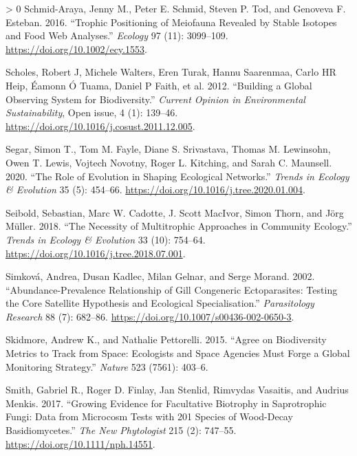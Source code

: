 \documentclass[11pt]{article}
\newlength{\cslhangindent}
\newenvironment{CSLReferences}[3] %
 {%
  \setlength{\parindent}{0pt}
  \ifodd #1 \everypar{\setlength{\hangindent}{\cslhangindent}}\ignorespaces\fi
  \ifnum #2 > 0
  \setlength{\parskip}{#2\baselineskip}
  \fi
 }%
 {}
\begin{document}
\begin{CSLReferences}{1}{0}
\leavevmode\hypertarget{ref-Schmid-Araya2016TroPos}{}%
Schmid-Araya, Jenny M., Peter E. Schmid, Steven P. Tod, and Genoveva F.
Esteban. 2016. {``Trophic Positioning of Meiofauna Revealed by Stable
Isotopes and Food Web Analyses.''} \emph{Ecology} 97 (11): 3099--109.
\url{https://doi.org/10.1002/ecy.1553}.

\leavevmode\hypertarget{ref-Scholes2012BuiGlo}{}%
Scholes, Robert J, Michele Walters, Eren Turak, Hannu Saarenmaa, Carlo
HR Heip, Éamonn Ó Tuama, Daniel P Faith, et al. 2012. {``Building a
Global Observing System for Biodiversity.''} \emph{Current Opinion in
Environmental Sustainability}, Open issue, 4 (1): 139--46.
\url{https://doi.org/10.1016/j.cosust.2011.12.005}.

\leavevmode\hypertarget{ref-Segar2020RolEvo}{}%
Segar, Simon T., Tom M. Fayle, Diane S. Srivastava, Thomas M. Lewinsohn,
Owen T. Lewis, Vojtech Novotny, Roger L. Kitching, and Sarah C.
Maunsell. 2020. {``The Role of Evolution in Shaping Ecological
Networks.''} \emph{Trends in Ecology \& Evolution} 35 (5): 454--66.
\url{https://doi.org/10.1016/j.tree.2020.01.004}.

\leavevmode\hypertarget{ref-Seibold2018NecMul}{}%
Seibold, Sebastian, Marc W. Cadotte, J. Scott MacIvor, Simon Thorn, and
Jörg Müller. 2018. {``The Necessity of Multitrophic Approaches in
Community Ecology.''} \emph{Trends in Ecology \& Evolution} 33 (10):
754--64. \url{https://doi.org/10.1016/j.tree.2018.07.001}.

\leavevmode\hypertarget{ref-Simkova2002AbuRel}{}%
Simková, Andrea, Dusan Kadlec, Milan Gelnar, and Serge Morand. 2002.
{``Abundance-Prevalence Relationship of Gill Congeneric Ectoparasites:
Testing the Core Satellite Hypothesis and Ecological Specialisation.''}
\emph{Parasitology Research} 88 (7): 682--86.
\url{https://doi.org/10.1007/s00436-002-0650-3}.

\leavevmode\hypertarget{ref-Skidmore2015AgrBio}{}%
Skidmore, Andrew K., and Nathalie Pettorelli. 2015. {``Agree on
Biodiversity Metrics to Track from Space: Ecologists and Space Agencies
Must Forge a Global Monitoring Strategy.''} \emph{Nature} 523 (7561):
403--6.

\leavevmode\hypertarget{ref-Smith2017GroEvi}{}%
Smith, Gabriel R., Roger D. Finlay, Jan Stenlid, Rimvydas Vasaitis, and
Audrius Menkis. 2017. {``Growing Evidence for Facultative Biotrophy in
Saprotrophic Fungi: Data from Microcosm Tests with 201 Species of
Wood-Decay Basidiomycetes.''} \emph{The New Phytologist} 215 (2):
747--55. \url{https://doi.org/10.1111/nph.14551}.


\end{CSLReferences}
\end{document}
